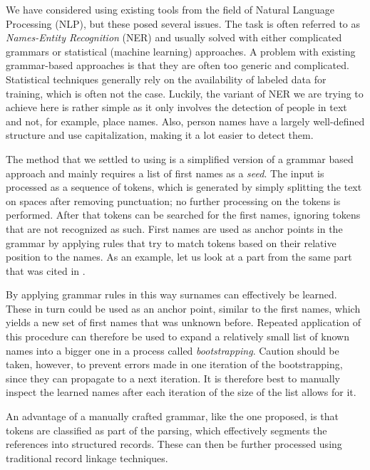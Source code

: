 \documentclass[paper=a4, fontsize=11pt]{scrartcl}
\begin{document}
We have considered using existing tools from the field of Natural Language Processing (NLP), but these posed several issues.
The task is often referred to as \emph{Names-Entity Recognition} (NER) and usually solved with either complicated grammars or statistical (machine learning) approaches.
A problem with existing grammar-based approaches is that they are often too generic and complicated.
Statistical techniques generally rely on the availability of labeled data for training, which is often not the case.
Luckily, the variant of NER we are trying to achieve here is rather simple as it only involves the detection of people in text and not, for example, place names.
Also, person names have a largely well-defined structure and use capitalization, making it a lot easier to detect them.

The method that we settled to using is a simplified version of a grammar based approach and mainly requires a list of first names as a \emph{seed}.
The input is processed as a sequence of tokens, which is generated by simply splitting the text on spaces after removing punctuation; no further processing on the tokens is performed.
After that tokens can be searched for the first names, ignoring tokens that are not recognized as such.
First names are used as anchor points in the grammar by applying rules that try to match tokens based on their relative position to the names.
As an example, let us look at a part from the same part that was cited in .

By applying grammar rules in this way surnames can effectively be learned.
These in turn could be used as an anchor point, similar to the first names, which yields a new set of first names that was unknown before.
Repeated application of this procedure can therefore be used to expand a relatively small list of known names into a bigger one in a process called \emph{bootstrapping}.
Caution should be taken, however, to prevent errors made in one iteration of the bootstrapping, since they can propagate to a next iteration.
It is therefore best to manually inspect the learned names after each iteration of the size of the list allows for it.

An advantage of a manually crafted grammar, like the one proposed, is that tokens are classified as part of the parsing, which effectively segments the references into structured records.
These can then be further processed using traditional record linkage techniques.
\end{document}
